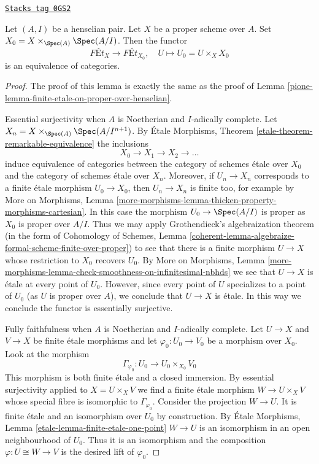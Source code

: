\begin{lemma}
\label{pione-lemma-finite-etale-on-proper-over-henselian-pair}
\href{https://stacks.math.columbia.edu/tag/0GS2}{\texttt{Stacks tag 0GS2}}

Let $(A, I)$ be a henselian pair. Let $X$ be a proper scheme over $A$.
Set $X_0 = X \times_{\Spec(A)} \Spec(A/I)$. Then the functor
$$
\textit{F\'Et}_X \to \textit{F\'Et}_{X_0},\quad
U \longmapsto U_0 = U \times_X X_0
$$
is an equivalence of categories.
\end{lemma}

\begin{proof}

The proof of this lemma is exactly the same as the proof of
Lemma \ref{pione-lemma-finite-etale-on-proper-over-henselian}.

\medskip\noindent
Essential surjectivity when $A$ is Noetherian and $I$-adically complete.
Let $X_n = X \times_{\Spec(A)} \Spec(A/I^{n + 1})$.
By \'Etale Morphisms, Theorem \ref{etale-theorem-remarkable-equivalence}
the inclusions
$$
X_0 \to X_1 \to X_2 \to \ldots
$$
induce equivalence of categories between the category
of schemes \'etale over $X_0$ and the category of schemes
\'etale over $X_n$.
Moreover, if $U_n \to X_n$ corresponds to a finite \'etale
morphism $U_0 \to X_0$, then $U_n \to X_n$ is finite too, for example
by More on Morphisms, Lemma
\ref{more-morphisms-lemma-thicken-property-morphisms-cartesian}.
In this case the morphism $U_0 \to \Spec(A/I)$
is proper as $X_0$ is proper over $A/I$. Thus we may apply
Grothendieck's algebraization theorem
(in the form of
Cohomology of Schemes, Lemma
\ref{coherent-lemma-algebraize-formal-scheme-finite-over-proper})
to see that there is a finite morphism $U \to X$ whose restriction
to $X_0$ recovers $U_0$. By More on Morphisms, Lemma
\ref{more-morphisms-lemma-check-smoothness-on-infinitesimal-nbhds}
we see that $U \to X$ is \'etale at every point of $U_0$.
However, since every point of $U$ specializes to a point of $U_0$
(as $U$ is proper over $A$), we conclude that $U \to X$ is \'etale.
In this way we conclude the functor is essentially surjective.

\medskip\noindent
Fully faithfulness when $A$ is Noetherian and $I$-adically complete.
Let $U \to X$ and $V \to X$ be finite \'etale morphisms and
let $\varphi_0 : U_0 \to V_0$ be a morphism over $X_0$. Look at
the morphism
$$
\Gamma_{\varphi_0} : U_0 \longrightarrow U_0 \times_{X_0} V_0
$$
This morphism is both finite \'etale and a closed immersion.
By essential surjectivity applied to $X = U \times_X V$ we find
a finite \'etale morphism $W \to U \times_X V$ whose special
fibre is isomorphic to $\Gamma_{\varphi_0}$. Consider the projection
$W \to U$. It is finite \'etale and an isomorphism over $U_0$ by
construction. By \'Etale Morphisms, Lemma
\ref{etale-lemma-finite-etale-one-point}
$W \to U$ is an isomorphism in an open neighbourhood of $U_0$.
Thus it is an isomorphism and the composition $\varphi : U \cong W \to V$
is the desired lift of $\varphi_0$.


\end{proof}
